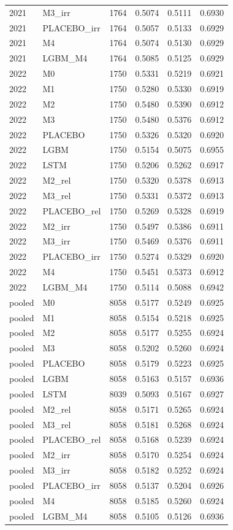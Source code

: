 \begin{tabular}{llrrrr}
2021 & M3\_irr & 1764 & 0.5074 & 0.5111 & 0.6930 \\
2021 & PLACEBO\_irr & 1764 & 0.5057 & 0.5133 & 0.6929 \\
2021 & M4 & 1764 & 0.5074 & 0.5130 & 0.6929 \\
2021 & LGBM\_M4 & 1764 & 0.5085 & 0.5125 & 0.6929 \\
2022 & M0 & 1750 & 0.5331 & 0.5219 & 0.6921 \\
2022 & M1 & 1750 & 0.5280 & 0.5330 & 0.6919 \\
2022 & M2 & 1750 & 0.5480 & 0.5390 & 0.6912 \\
2022 & M3 & 1750 & 0.5480 & 0.5376 & 0.6912 \\
2022 & PLACEBO & 1750 & 0.5326 & 0.5320 & 0.6920 \\
2022 & LGBM & 1750 & 0.5154 & 0.5075 & 0.6955 \\
2022 & LSTM & 1750 & 0.5206 & 0.5262 & 0.6917 \\
2022 & M2\_rel & 1750 & 0.5320 & 0.5378 & 0.6913 \\
2022 & M3\_rel & 1750 & 0.5331 & 0.5372 & 0.6913 \\
2022 & PLACEBO\_rel & 1750 & 0.5269 & 0.5328 & 0.6919 \\
2022 & M2\_irr & 1750 & 0.5497 & 0.5386 & 0.6911 \\
2022 & M3\_irr & 1750 & 0.5469 & 0.5376 & 0.6911 \\
2022 & PLACEBO\_irr & 1750 & 0.5274 & 0.5329 & 0.6920 \\
2022 & M4 & 1750 & 0.5451 & 0.5373 & 0.6912 \\
2022 & LGBM\_M4 & 1750 & 0.5114 & 0.5088 & 0.6942 \\
pooled & M0 & 8058 & 0.5177 & 0.5249 & 0.6925 \\
pooled & M1 & 8058 & 0.5154 & 0.5218 & 0.6925 \\
pooled & M2 & 8058 & 0.5177 & 0.5255 & 0.6924 \\
pooled & M3 & 8058 & 0.5202 & 0.5260 & 0.6924 \\
pooled & PLACEBO & 8058 & 0.5179 & 0.5223 & 0.6925 \\
pooled & LGBM & 8058 & 0.5163 & 0.5157 & 0.6936 \\
pooled & LSTM & 8039 & 0.5093 & 0.5167 & 0.6927 \\
pooled & M2\_rel & 8058 & 0.5171 & 0.5265 & 0.6924 \\
pooled & M3\_rel & 8058 & 0.5181 & 0.5268 & 0.6924 \\
pooled & PLACEBO\_rel & 8058 & 0.5168 & 0.5239 & 0.6924 \\
pooled & M2\_irr & 8058 & 0.5170 & 0.5254 & 0.6924 \\
pooled & M3\_irr & 8058 & 0.5182 & 0.5252 & 0.6924 \\
pooled & PLACEBO\_irr & 8058 & 0.5137 & 0.5204 & 0.6926 \\
pooled & M4 & 8058 & 0.5185 & 0.5260 & 0.6924 \\
pooled & LGBM\_M4 & 8058 & 0.5105 & 0.5126 & 0.6936 \\
\bottomrule
\end{tabular}
